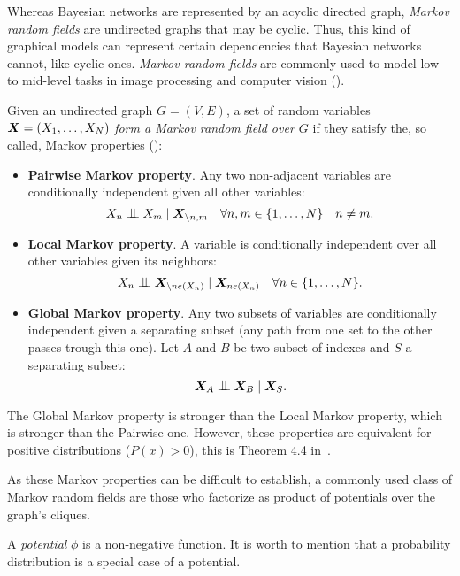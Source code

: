 
Whereas Bayesian networks are represented by an acyclic directed graph, \emph{Markov random fields} are undirected graphs that may be cyclic. Thus, this kind of graphical models can represent certain dependencies that Bayesian networks cannot, like cyclic ones. \emph{Markov random fields} are commonly used to model low-to mid-level tasks in image processing and computer vision (\cite{li2009markov}).

\begin{definition}
  Given an undirected graph \(G = (V, E)\), a set of random variables \(\bm{X} = (X_{1}, \dots, X_{N})\) \emph{form a Markov random field over \(G\)} if they satisfy the, so called, Markov properties (\cite{barber}):
  \begin{itemize}
  \item \textbf{Pairwise Markov property}. Any two non-adjacent variables are
      conditionally independent given all other variables:
      \[
      X_{n} \bigCI X_{m} \mid \bX_{\backslash n,m} \quad \forall n,m \in \{1,\dots,N\} \quad n \neq m.
      \]
    \item \textbf{Local Markov property}. A variable is conditionally independent over all
    other variables given its neighbors:
    \[
      X_{n} \bigCI \bX_{\backslash ne(X_{n})} \mid \bX_{ne(X_{n})} \quad \forall n \in \{1,\dots,N\}.
      \]
  \item \textbf{Global Markov property}. Any two subsets of variables are conditionally
    independent given a separating subset (any path from one set to the other
      passes trough this one). Let \(A\) and \(B\) be two subset of indexes and \(S\) a separating subset:
      \[
      \bX_{A} \bigCI \bX_{B} \mid \bX_{S}.
      \]
  \end{itemize}

  The Global Markov property is stronger than the Local Markov property, which is stronger than the Pairwise one. However, these properties are equivalent for positive distributions (\(P(x) > 0\)), this is Theorem 4.4 in~\cite{koller_friedman}.
\end{definition}

As these Markov properties can be difficult to establish, a commonly used class of Markov random fields are those who factorize as product of potentials over the graph's cliques.

\begin{definition}
A \emph{potential} \(\phi\) is a non-negative function. It is worth to mention
that a probability distribution is a special case of a potential.
\end{definition}

